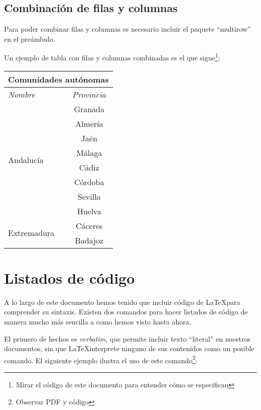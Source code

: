 \subsection{Combinación de filas y columnas}

Para poder combinar filas y columnas es necesario incluir el paquete ``multirow'' en el preámbulo.

Un ejemplo de tabla con filas y columnas combinadas es el que sigue\footnote{Mirar el código de este documento para entender cómo se especifican}:

\begin{tabular}{ |l||c|  }
 \hline
 \multicolumn{2}{|c|}{\textbf{Comunidades autónomas}} \\
 \hline
  \emph{Nombre} & \emph{Provincia}\\
 \hline
 \multirow{8}{*}{Andalucía} & Granada\\
 \cline{2 - 2} %
 	& Almería\\
 \cline{2 - 2}
 	& Jaén\\
 \cline{2 - 2}
 	& Málaga\\
 \cline{2 - 2}
 	& Cádiz\\
 \cline{2 - 2}
 	& Córdoba\\
 \cline{2 - 2}
 	& Sevilla\\
 \cline{2 - 2}
 	& Huelva\\
 \hline
 \multirow{2}{*}{Extremadura} & Cáceres\\
 \cline{2 - 2} %
 	& Badajoz\\
 \hline
\end{tabular}

\section{Listados de código}

A lo largo de este documento hemos tenido que incluir código de \LaTeX para comprender su sintaxis. Existen dos comandos para hacer listados de código de manera mucho más sencilla a como hemos visto hasta ahora.

El primero de hechos es \emph{verbatim}, que permite incluir texto ``literal'' en nuestros documentos, sin que \LaTeX interprete ninguno de sus contenidos como un posible comando. El siguiente ejemplo ilustra el uso de este comando\footnote{Observar PDF y código}:

